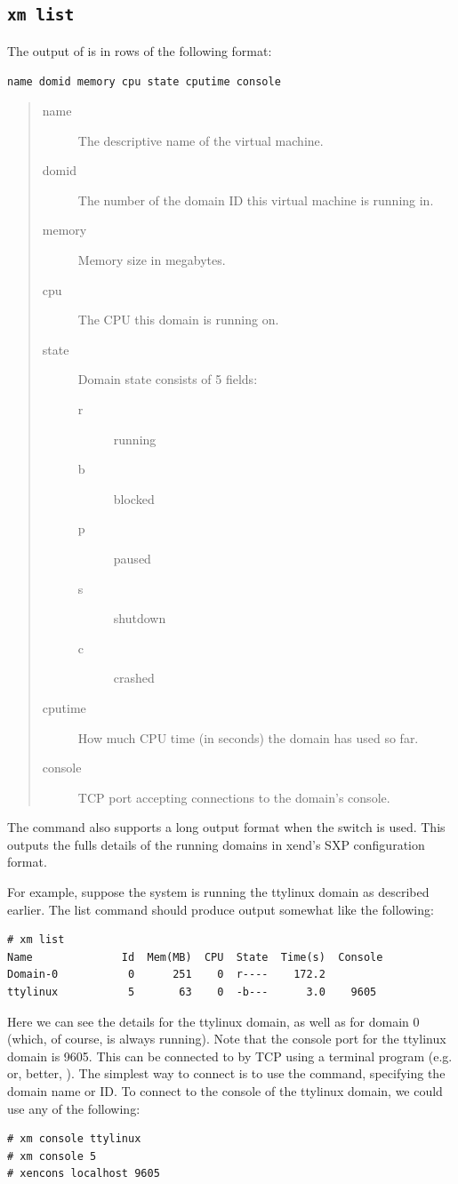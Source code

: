 \documentclass[11pt,twoside,final,openright]{report}
\def\xend{{xend}\xspace}
\begin{document}
\subsection{\tt xm list}

The output of  is in rows of the following format:
\begin{center}
{\tt name domid memory cpu state cputime console}
\end{center}

\begin{quote}
\begin{description}
\item[name]  The descriptive name of the virtual machine.
\item[domid] The number of the domain ID this virtual machine is running in.
\item[memory] Memory size in megabytes.
\item[cpu]   The CPU this domain is running on.
\item[state] Domain state consists of 5 fields:
  \begin{description}
  \item[r] running
  \item[b] blocked
  \item[p] paused
  \item[s] shutdown
  \item[c] crashed
  \end{description}
\item[cputime] How much CPU time (in seconds) the domain has used so far.
\item[console] TCP port accepting connections to the domain's console.
\end{description}
\end{quote}

The  command also supports a long output format when the
 switch is used.  This outputs the fulls details of the
running domains in \xend's SXP configuration format.

For example, suppose the system is running the ttylinux domain as
described earlier.  The list command should produce output somewhat
like the following:
\begin{verbatim}
# xm list
Name              Id  Mem(MB)  CPU  State  Time(s)  Console
Domain-0           0      251    0  r----    172.2        
ttylinux           5       63    0  -b---      3.0    9605
\end{verbatim}

Here we can see the details for the ttylinux domain, as well as for
domain 0 (which, of course, is always running).  Note that the console
port for the ttylinux domain is 9605.  This can be connected to by TCP
using a terminal program (e.g.  or, better, 
).  The simplest way to connect is to use the 
command, specifying the domain name or ID.  To connect to the console
of the ttylinux domain, we could use any of the following: 
\begin{verbatim}
# xm console ttylinux
# xm console 5
# xencons localhost 9605
\end{verbatim}
\end{document}
